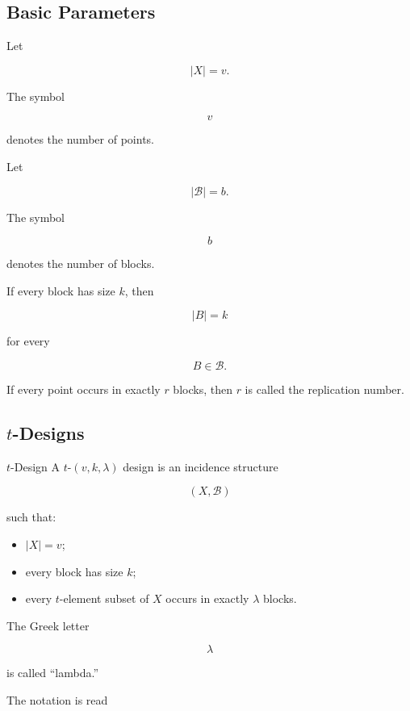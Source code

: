 \subsection{Basic Parameters}
\label{subsec:design-basic-parameters}

Let

\[
|X|=v.
\]

The symbol

\[
v
\]

denotes the number of points.

Let

\[
|\mathcal{B}|=b.
\]

The symbol

\[
b
\]

denotes the number of blocks.

If every block has size \(k\), then

\[
\boxed{
|B|=k
}
\]

for every

\[
B\in\mathcal{B}.
\]

If every point occurs in exactly \(r\) blocks, then \(r\) is called the
replication number.

\subsection{\(t\)-Designs}
\label{subsec:t-designs}

\begin{definitionbox}{\(t\)-Design}
A \(t\)-\((v,k,\lambda)\) design is an incidence structure

\[
(X,\mathcal{B})
\]

such that:

\begin{itemize}
    \item \(|X|=v\);
    \item every block has size \(k\);
    \item every \(t\)-element subset of \(X\) occurs in exactly
          \(\lambda\) blocks.
\end{itemize}
\end{definitionbox}

The Greek letter

\[
\lambda
\]

is called ``lambda.''

The notation is read

